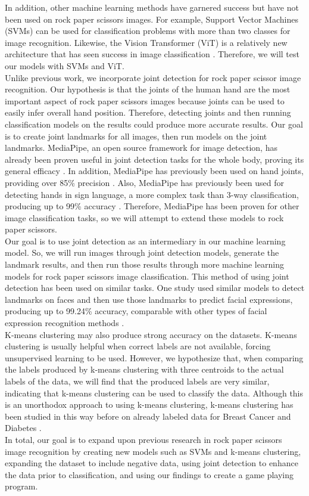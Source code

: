 \documentclass{article}
\begin{document}
In addition, other machine learning methods have garnered success but have not been used on rock paper scissors images. For example, Support Vector Machines (SVMs) can be used for classification problems with more than two classes for image recognition. Likewise, the Vision Transformer (ViT) is a relatively new architecture that has seen success in image classification \cite{vit}. Therefore, we will test our models with SVMs and ViT.\\
Unlike previous work, we incorporate joint detection for rock paper scissor image recognition. Our hypothesis is that the joints of the human hand are the most important aspect of rock paper scissors images because joints can be used to easily infer overall hand position. Therefore, detecting joints and then running classification models on the results could produce more accurate results. Our goal is to create joint landmarks for all images, then run models on the joint landmarks. MediaPipe, an open source framework for image detection, has already been proven useful in joint detection tasks for the whole body, proving its general efficacy \cite{9973559}. In addition, MediaPipe has previously been used on hand joints, providing over 85\% precision \cite{DBLP:journals/corr/abs-2006-10214}. Also, MediaPipe has previously been used for detecting hands in sign language, a more complex task than 3-way classification, producing up to 99\% accuracy \cite{kavana2022recognization}. Therefore, MediaPipe has been proven for other image classification tasks, so we will attempt to extend these models to rock paper scissors. \\
Our goal is to use joint detection as an intermediary in our machine learning model. So, we will run images through joint detection models, generate the landmark results, and then run those results through more machine learning models for rock paper scissors image classification. This method of using joint detection has been used on similar tasks. One study used similar models to detect landmarks on faces and then use those landmarks to predict facial expressions, producing up to 99.24\% accuracy, comparable with other types of facial expression recognition methods \cite{8528894}.\\
K-means clustering may also produce strong accuracy on the datasets. K-means clustering is usually helpful when correct labels are not available, forcing unsupervised learning to be used. However, we hypothesize that, when comparing the labels produced by k-means clustering with three centroids to the actual labels of the data, we will find that the produced labels are very similar, indicating that k-means clustering can be used to classify the data. Although this is an unorthodox approach to using k-means clustering, k-means clustering has been studied in this way before on already labeled data for Breast Cancer and Diabetes \cite{10.1007/978-3-642-14834-7_40}.\\
In total, our goal is to expand upon previous research in rock paper scissors image recognition by creating new models such as SVMs and k-means clustering, expanding the dataset to include negative data, using joint detection to enhance the data prior to classification, and using our findings to create a game playing program.
\end{document}
